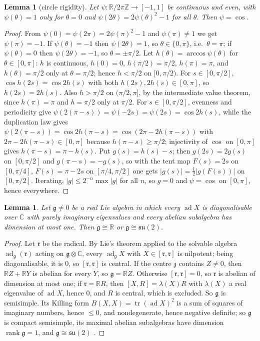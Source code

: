 \documentclass[11pt,reqno]{amsart}
\newtheorem{lemma}[theorem]{Lemma}
\theoremstyle{definition}
\theoremstyle{remark}
\numberwithin{equation}{section}
\newcommand{\R}{\mathbb{R}}
\newcommand{\C}{\mathbb{C}}
\newcommand{\Z}{\mathbb{Z}}
\newcommand{\g}{\mathfrak{g}}
\newcommand{\z}{\mathfrak{z}}
\newcommand{\su}{\mathfrak{su}}
\newcommand{\ad}{\operatorname{ad}}
\newcommand{\rk}{\operatorname{rank}}
\begin{document}
\begin{lemma}[circle rigidity]\label{lem:circle}
Let $\psi\colon\R/2\pi\Z\to[-1,1]$ be continuous and even, with $\psi(\theta)=1$ only for $\theta=0$ and
$\psi(2\theta)=2\psi(\theta)^2-1$ for all $\theta$.  Then $\psi=\cos$.
\end{lemma}
\begin{proof}
From $\psi(0)=\psi(2\pi)=2\psi(\pi)^2-1$ and $\psi(\pi)\ne1$ we get $\psi(\pi)=-1$.  If $\psi(\theta)=-1$ then $\psi(2\theta)=1$,
so $\theta\in\{0,\pi\}$, i.e.\ $\theta=\pi$; if $\psi(\theta)=0$ then $\psi(2\theta)=-1$, so $\theta=\pm\pi/2$.  Let
$h(\theta)=\arccos\psi(\theta)$ for $\theta\in[0,\pi]$: $h$ is continuous, $h(0)=0$, $h(\pi/2)=\pi/2$, $h(\pi)=\pi$, and
$h(\theta)=\pi/2$ only at $\theta=\pi/2$; hence $h<\pi/2$ on $[0,\pi/2)$.  For $s\in[0,\pi/2]$, $\cos h(2s)=\cos2h(s)$ with both
$h(2s),2h(s)\in[0,\pi]$, so $h(2s)=2h(s)$.  Also $h>\pi/2$ on $(\pi/2,\pi]$, by the intermediate value theorem, since
$h(\pi)=\pi$ and $h=\pi/2$ only at $\pi/2$.  For $s\in[0,\pi/2]$, evenness and periodicity give
$\psi(2(\pi-s))=\psi(-2s)=\psi(2s)=\cos2h(s)$, while the duplication law gives $\psi(2(\pi-s))=\cos2h(\pi-s)=\cos(2\pi-2h(\pi-s))$
with $2\pi-2h(\pi-s)\in[0,\pi]$ because $h(\pi-s)\ge\pi/2$; injectivity of $\cos$ on $[0,\pi]$ gives $h(\pi-s)=\pi-h(s)$.  Put $g(s)=h(s)-s$; then $g(2s)=2g(s)$ on $[0,\pi/2]$ and $g(\pi-s)=-g(s)$, so
with the tent map $F(s)=2s$ on $[0,\pi/4]$, $F(s)=\pi-2s$ on $[\pi/4,\pi/2]$ one gets $\lvert g(s)\rvert=\tfrac12\lvert g(F(s))\rvert$
on $[0,\pi/2]$.  Iterating, $\lvert g\rvert\le2^{-n}\max\lvert g\rvert$ for all $n$, so $g=0$ and $\psi=\cos$ on $[0,\pi]$, hence
everywhere.
\end{proof}

\begin{lemma}\label{lem:elliptic}
Let $\g\ne0$ be a real Lie algebra in which every $\ad X$ is diagonalisable over $\C$ with purely imaginary
eigenvalues and every abelian subalgebra has dimension at most one.  Then $\g\cong\R$ or $\g\cong\su(2)$.
\end{lemma}
\begin{proof}
Let $\mathfrak r$ be the radical.  By Lie's theorem applied to the solvable algebra $\ad_\g(\mathfrak r)$ acting on
$\g\otimes\C$, every $\ad_\g X$ with $X\in[\mathfrak r,\mathfrak r]$ is nilpotent; being diagonalisable, it is $0$, so
$[\mathfrak r,\mathfrak r]$ is central.  If the centre $\z$ contains $Z\ne0$, then $\R Z+\R Y$ is abelian for every $Y$, so
$\g=\R Z$.  Otherwise $[\mathfrak r,\mathfrak r]=0$, so $\mathfrak r$ is abelian of dimension at most one; if
$\mathfrak r=\R R$, then $[X,R]=\lambda(X)R$ with $\lambda(X)$ a real eigenvalue of $\ad X$, hence $0$, and $R$ is central,
which is excluded.  So $\g$ is semisimple.  Its Killing form $B(X,X)=\operatorname{tr}(\ad X)^2$ is a sum of squares of
imaginary numbers, hence $\le0$, and nondegenerate, hence negative definite; so $\g$ is compact semisimple, its
maximal abelian subalgebras have dimension $\rk\g=1$, and $\g\cong\su(2)$ \cite[Ch.~IV]{Knapp}.
\end{proof}
\end{document}
